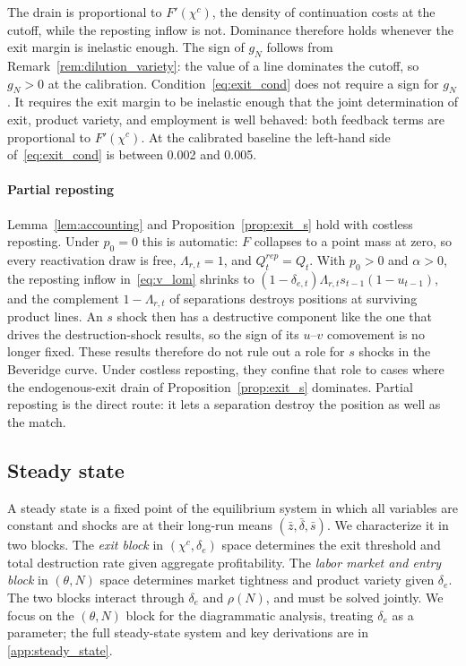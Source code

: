 \documentclass[authoryear, review, 12pt]{elsarticle}
\begin{document}
The drain is proportional to $F'(\chi^c)$, the density of continuation costs at the cutoff,
while the reposting inflow is not. Dominance therefore holds whenever the exit margin is
inelastic enough. The sign of $g_N$ follows from Remark~\ref{rem:dilution_variety}: the
value of a line dominates the cutoff, so $g_N>0$ at the calibration.
Condition~\eqref{eq:exit_cond} does not require a sign for $g_N$. It requires the exit
margin to be inelastic enough that the joint determination of exit, product variety, and
employment is well behaved: both feedback terms are proportional to $F'(\chi^c)$.
At the calibrated baseline the left-hand side of~\eqref{eq:exit_cond}
is between 0.002 and 0.005.

\paragraph{Partial reposting}
Lemma~\ref{lem:accounting} and Proposition~\ref{prop:exit_s} hold with costless reposting.
Under $p_0=0$ this is automatic: $F$ collapses to a point mass at zero, so every
reactivation draw is free, $\Lambda_{r,t}=1$, and
$Q_t^{rep}=Q_t$. With $p_0>0$ and $\alpha>0$, the reposting inflow
in~\eqref{eq:v_lom} shrinks to
$(1-\delta_{e,t})\Lambda_{r,t}s_{t-1}(1-u_{t-1})$, and the complement
$1-\Lambda_{r,t}$ of separations destroys positions at surviving
product lines. An $s$ shock then has a destructive component like the
one that drives the destruction-shock results, so the sign of its $u$--$v$ comovement is no
longer fixed. These results therefore do not rule out a role for
$s$ shocks in the Beveridge curve. Under costless reposting, they
confine that role to cases where the endogenous-exit drain of
Proposition~\ref{prop:exit_s} dominates. Partial reposting is the direct route: it lets a
separation destroy the position as well as the match.

\subsection{Steady state}\label{sec:steady_state}

A steady state is a fixed point of the equilibrium system 
in which all variables are constant and shocks are at their 
long-run means $(\bar{z},\bar{\delta},\bar{s})$. We 
characterize it in two blocks. The \emph{exit block} in 
$(\chi^c, \delta_e)$ space determines the exit threshold 
and total destruction rate given aggregate profitability. 
The \emph{labor market and entry block} in $(\theta, N)$ 
space determines market tightness and product variety given 
$\delta_e$. The two blocks interact through $\delta_e$ and 
$\rho(N)$, and must be solved jointly. We focus on the 
$(\theta, N)$ block for the diagrammatic analysis, treating 
$\delta_e$ as a parameter; the full steady-state system 
and key derivations are in 
\ref{app:steady_state}.
\end{document}
